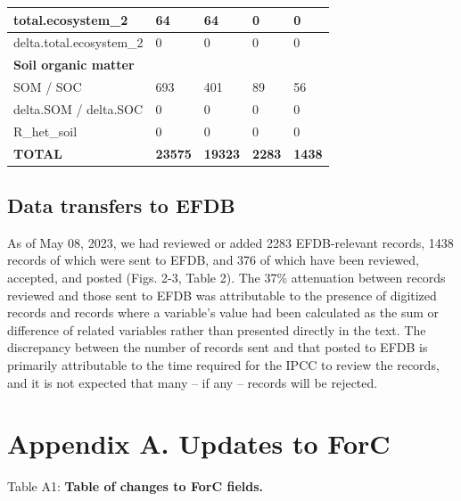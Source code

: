 \documentclass[, manuscript]{copernicus}
\begin{document}
\begin{longtable}[t]{l|l|l|l|l}
\hline
total.ecosystem\_2 & 64 & 64 & 0 & 0\\
\hline
delta.total.ecosystem\_2 & 0 & 0 & 0 & 0\\
\hline
\textbf{Soil organic matter} & \textbf{} & \textbf{} & \textbf{} & \textbf{}\\
\hline
SOM / SOC & 693 & 401 & 89 & 56\\
\hline
delta.SOM / delta.SOC & 0 & 0 & 0 & 0\\
\hline
R\_het\_soil & 0 & 0 & 0 & 0\\
\hline
\textbf{TOTAL} & \textbf{23575} & \textbf{19323} & \textbf{2283} & \textbf{1438}\\
\hline
\end{longtable}
\endgroup{}

\subsection{Data transfers to EFDB}

As of May 08, 2023, we had reviewed or added 2283 EFDB-relevant records,
1438 records of which were sent to EFDB, and 376 of which have been
reviewed, accepted, and posted (Figs. 2-3, Table 2). The 37\%
attenuation between records reviewed and those sent to EFDB was
attributable to the presence of digitized records and records where a
variable's value had been calculated as the sum or difference of related
variables rather than presented directly in the text. The discrepancy
between the number of records sent and that posted to EFDB is primarily
attributable to the time required for the IPCC to review the records,
and it is not expected that many -- if any -- records will be rejected.

\clearpage

\section*{Appendix A. Updates to ForC}

\captionsetup[table]{labelformat=empty}

Table A1: \textbf{Table of changes to ForC fields.}
\begingroup\fontsize{8}{10}\selectfont
\end{document}
